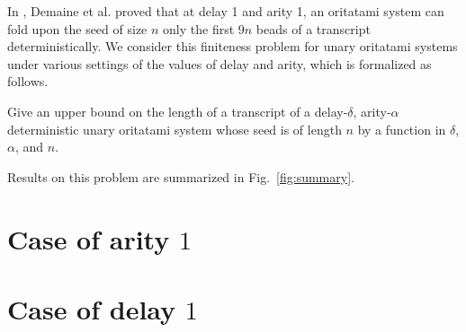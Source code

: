\documentclass[runningheads]{llncs}
\begin{document}
In \cite{DHOPRSST2018}, Demaine et al. proved that at delay 1 and arity 1, an oritatami system can fold upon the seed of size $n$ only the first $9n$ beads of a transcript deterministically. 
We consider this finiteness problem for unary oritatami systems under various settings of the values of delay and arity, which is formalized as follows. 

\begin{problem}\label{prob:det_unary_length}
Give an upper bound on the length of a transcript of a delay-$\delta$, arity-$\alpha$ deterministic unary oritatami system whose seed is of length $n$ by a function in $\delta$, $\alpha$, and $n$. 
\end{problem}



Results on this problem are summarized in Fig.~\ref{fig:summary}. 


\section{Case of arity $1$}





\section{Case of delay $1$}








  
\end{document}

